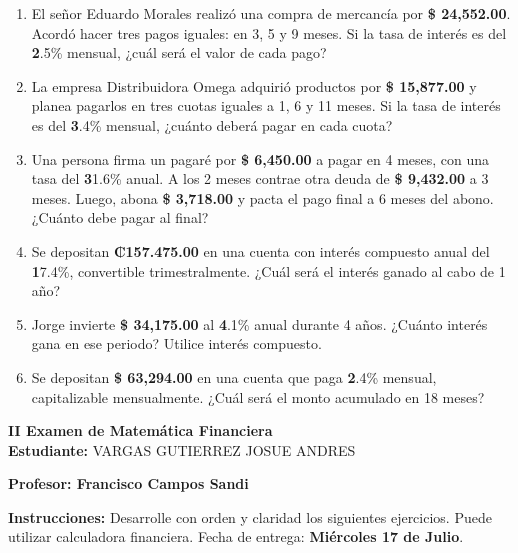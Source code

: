 \documentclass[14pt]{article}
\begin{document}
\begin{enumerate}
  \item El señor Eduardo Morales realizó una compra de mercancía por \textbf{\$ 24,552.00}. Acordó hacer tres pagos iguales: en 3, 5 y 9 meses. Si la tasa de interés es del \textbf2.5\% mensual, ¿cuál será el valor de cada pago?

  \item La empresa Distribuidora Omega adquirió productos por \textbf{\$ 15,877.00} y planea pagarlos en tres cuotas iguales a 1, 6 y 11 meses. Si la tasa de interés es del \textbf3.4\% mensual, ¿cuánto deberá pagar en cada cuota?

  \item Una persona firma un pagaré por \textbf{\$ 6,450.00} a pagar en 4 meses, con una tasa del \textbf31.6\% anual. A los 2 meses contrae otra deuda de \textbf{\$ 9,432.00} a 3 meses. Luego, abona \textbf{\$ 3,718.00} y pacta el pago final a 6 meses del abono. ¿Cuánto debe pagar al final?

  \item Se depositan \textbf{₡157.475.00} en una cuenta con interés compuesto anual del \textbf17.4\%, convertible trimestralmente. ¿Cuál será el interés ganado al cabo de 1 año?

  \item Jorge invierte \textbf{\$ 34,175.00} al \textbf4.1\% anual durante 4 años. ¿Cuánto interés gana en ese periodo? Utilice interés compuesto.

  \item Se depositan \textbf{\$ 63,294.00} en una cuenta que paga \textbf2.4\% mensual, capitalizable mensualmente. ¿Cuál será el monto acumulado en 18 meses?
\end{enumerate}
\newpage

\begin{center}
    {\LARGE \textbf{II Examen de Matemática Financiera}}\\[1em]
    {\large \textbf{Estudiante:} VARGAS GUTIERREZ JOSUE ANDRES}
\end{center}

\vspace{1cm}

\textbf{Profesor: Francisco Campos Sandi}

\textbf{Instrucciones:} Desarrolle con orden y claridad los siguientes ejercicios. Puede utilizar calculadora financiera. Fecha de entrega: \textbf{Miércoles 17 de Julio}.
\end{document}
